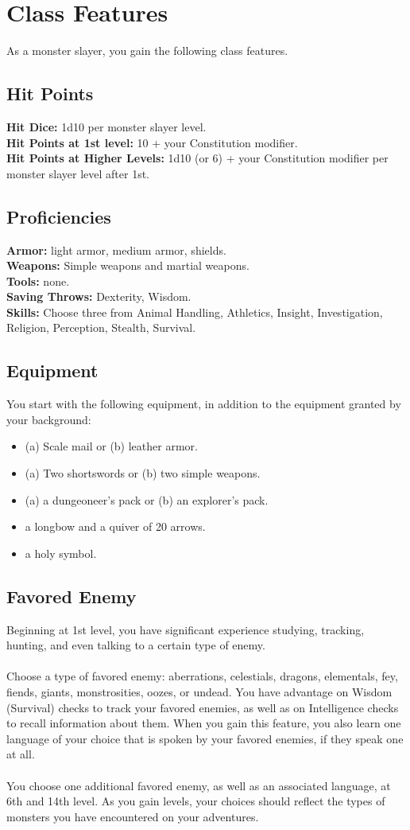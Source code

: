 \documentclass[11pt,a4paper,twocolumn]{article}
\newcommand{\proficiency}[2]
{
	\textbf{#1:} #2. \\
}
\begin{document}
	\section*{Class Features}
	As a monster slayer, you gain the following class features.
	
	\subsection*{Hit Points}
	\proficiency{Hit Dice}{1d10 per monster slayer level}
	\proficiency{Hit Points at 1st level}{10 + your Constitution modifier}
	\proficiency{Hit Points at Higher Levels}{1d10 (or 6) + your Constitution modifier per monster slayer level after 1st}
	
	\subsection*{Proficiencies}
	\proficiency{Armor}{light armor, medium armor, shields}
	\proficiency{Weapons}{Simple weapons and martial weapons}
	\proficiency{Tools}{none}
	\proficiency{Saving Throws}{Dexterity, Wisdom}
	\proficiency{Skills}{Choose three from Animal Handling, Athletics, Insight, Investigation, Religion, Perception, Stealth, Survival}
	
	\subsection*{Equipment}
	You start with the following equipment, in
	addition to the equipment granted by your
	background:
	\begin{itemize}
		\item (a) Scale mail or (b) leather armor.
		\item (a) Two shortswords or (b) two simple weapons.
		\item (a) a dungeoneer's pack or (b) an explorer's pack.
		\item a longbow and a quiver of 20 arrows.
		\item a holy symbol.
	\end{itemize}
	\subsection*{Favored Enemy}
	Beginning at 1st level, you have significant experience studying, tracking, hunting, and even talking to a certain type of enemy. \\ \\
	Choose a type of favored enemy: aberrations, celestials, dragons, elementals, fey, fiends, giants, monstrosities, oozes, or undead.
	You have advantage on Wisdom (Survival) checks to track your favored enemies, as well as on Intelligence checks to recall information about them.
	When you gain this feature, you also learn one language of your choice that is spoken by your favored enemies, if they speak one at all. \\ \\
	You choose one additional favored enemy, as well as an associated language, at 6th and 14th level. As you gain levels, your choices should reflect the types of monsters you have encountered on your adventures.
	
\end{document}
